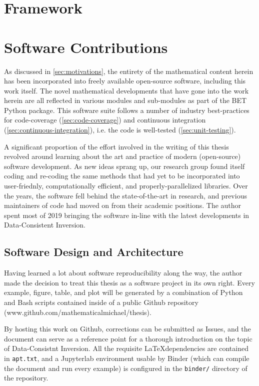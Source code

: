\section{Framework}\label{sec:framework}




\section{Software Contributions}\label{sec:ch01-software}
As discussed in \ref{sec:motivations}, the entirety of the mathematical content herein has been incorporated into freely available open-source software, including this work itself.
The novel mathematical developments that have gone into the work herein are all reflected in various modules and sub-modules as part of the BET Python package.
This software suite follows a number of industry best-practices for code-coverage (\ref{sec:code-coverage}) and continuous integration (\ref{sec:continuous-integration}), i.e. the code is well-tested (\ref{sec:unit-testing}).

A significant proportion of the effort involved in the writing of this thesis revolved around learning about the art and practice of modern (open-source) software development.
As new ideas sprang up, our research group found itself coding and re-coding the same methods that had yet to be incorporated into user-friednly, computationally efficient, and properly-parallelized libraries.
Over the years, the software fell behind the state-of-the-art in research, and previous maintainers of code had moved on from their academic positions.
The author spent most of 2019 bringing the software in-line with the latest developments in Data-Consistent Inversion.

\subsection{Software Design and Architecture}\label{sec:architecture}
Having learned a lot about software reproducibility along the way, the author made the decision to treat this thesis as a software project in its own right.
Every example, figure, table, and plot will be generated by a combination of Python and Bash scripts contained inside of a public Github repository (www.github.com/mathematicalmichael/thesis).

By hosting this work on Github, corrections can be submitted as Issues, and the document can serve as a reference point for a thorough introduction on the topic of Data-Consistnt Inversion.
All the requisite \LaTeX dependencies are contained in {\tt apt.txt}, and a Jupyterlab environment usable by Binder (which can compile the document and run every example) is configured in the {\tt binder/} directory of the repository.

